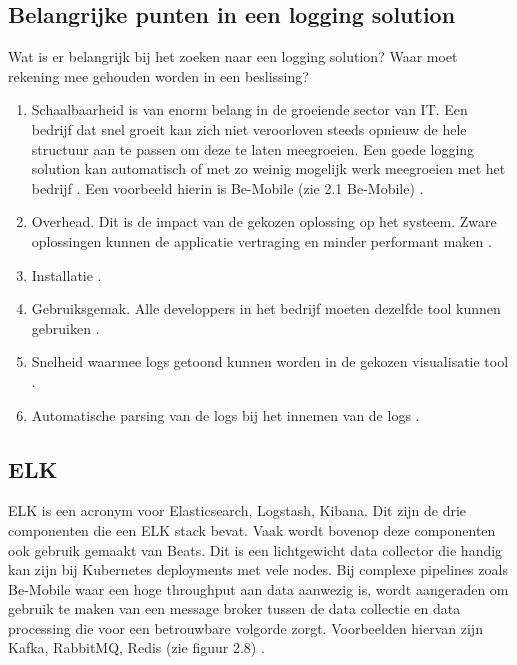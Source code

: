 \subsection{Belangrijke punten in een logging solution}

Wat is er belangrijk bij het zoeken naar een logging solution? Waar moet rekening mee gehouden worden in een beslissing?

\begin{enumerate}
    \item  Schaalbaarheid is van enorm belang in de groeiende sector van IT. Een bedrijf dat snel groeit kan zich niet veroorloven steeds opnieuw de hele structuur aan te passen om deze te laten meegroeien. Een goede logging solution kan automatisch of met zo weinig mogelijk werk meegroeien met het bedrijf \autocite{logdna2018}. Een voorbeeld hierin is Be-Mobile (zie 2.1 Be-Mobile) \autocite{jens2019}. 
    \item Overhead. Dit is de impact van de gekozen oplossing op het systeem. Zware oplossingen kunnen de applicatie vertraging en minder performant maken \autocite{gifford2015}.
    \item Installatie \autocite{logdna2018}.
    \item Gebruiksgemak. Alle developpers in het bedrijf moeten dezelfde tool kunnen gebruiken \autocite{logdna2018}.
    \item Snelheid waarmee logs getoond kunnen worden in de gekozen visualisatie tool \autocite{logdna2018}.
    \item Automatische parsing van de logs bij het innemen van de logs \autocite{logdna2018}.
\end{enumerate}

\subsection{ELK}
\label{subsec:ELK}
ELK is een acronym voor Elasticsearch, Logstash, Kibana. Dit zijn de drie componenten die een ELK stack bevat. Vaak wordt bovenop deze componenten ook gebruik gemaakt van Beats. Dit is een lichtgewicht data collector die handig kan zijn bij Kubernetes deployments met vele nodes. Bij complexe pipelines zoals Be-Mobile waar een hoge throughput aan data aanwezig is, wordt aangeraden om gebruik te maken van een message broker tussen de data collectie en data processing die voor een betrouwbare volgorde zorgt. Voorbeelden hiervan zijn Kafka, RabbitMQ, Redis (zie figuur 2.8) \autocite{berman2018-12}. 

